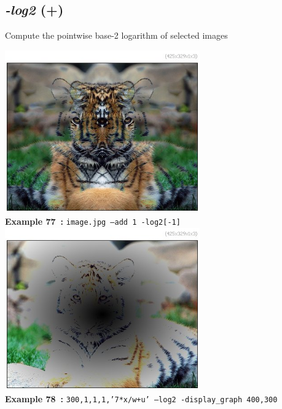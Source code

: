 \documentclass[a4paper,11pt,twoside]{book}
\begin{document}
\subsection{\emph{-log2} (+)}\vspace*{-0.5em}
Compute the pointwise base-2 logarithm of selected images
\begin{center}\includegraphics[keepaspectratio=true,height=7cm,width=\textwidth]{img/gmic_def77.jpg}\\
{\footnotesize \textbf{Example 77~:} \texttt{image.jpg --add 1 -log2[-1]}}
\\\includegraphics[keepaspectratio=true,height=7cm,width=\textwidth]{img/gmic_def78.jpg}\\
{\footnotesize \textbf{Example 78~:} \texttt{300,1,1,1,'7*x/w+u' --log2 -display\_graph 400,300}}
\end{center}
\end{document}
